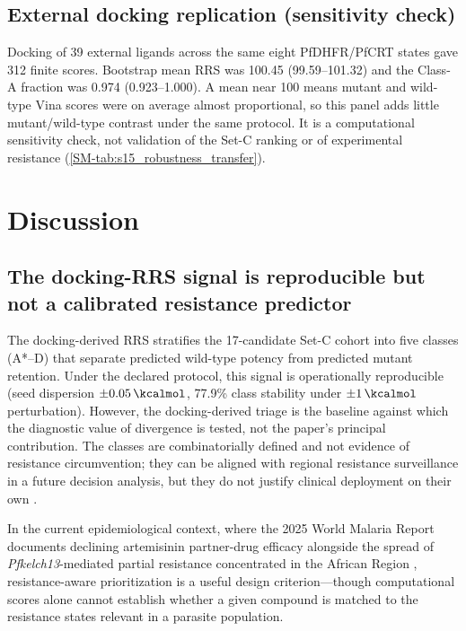 \documentclass[journal=jcisd8,manuscript=article,layout=traditional]{achemso}
\begin{document}
\subsection{External docking replication (sensitivity check)}

Docking of \num{39} external ligands across the same eight PfDHFR/PfCRT states gave \num{312} finite scores. Bootstrap mean RRS was \num{100.45} (\numrange{99.59}{101.32}) and the Class-A fraction was \num{0.974} (\numrange{0.923}{1.000}). A mean near \num{100} means mutant and wild-type Vina scores were on average almost proportional, so this panel adds little mutant/wild-type contrast under the same protocol. It is a computational sensitivity check, not validation of the Set-C ranking or of experimental resistance (\cref{SM-tab:s15_robustness_transfer}).


\section{Discussion}

\subsection{The docking-RRS signal is reproducible but not a calibrated resistance predictor}

The docking-derived RRS stratifies the 17-candidate Set-C cohort into five classes (A*--D) that separate predicted wild-type potency from predicted mutant retention. Under the declared protocol, this signal is operationally reproducible (seed dispersion $\pm\qty{0.05}{\kcalmol}$, 77.9\% class stability under $\pm\qty{1}{\kcalmol}$ perturbation). However, the docking-derived triage is the baseline against which the diagnostic value of divergence is tested, not the paper's principal contribution. The classes are combinatorially defined and not evidence of resistance circumvention; they can be aligned with regional resistance surveillance in a future decision analysis, but they do not justify clinical deployment on their own \citep{wwarn_2026}.

In the current epidemiological context, where the 2025 World Malaria Report documents declining artemisinin partner-drug efficacy alongside the spread of \textit{Pfkelch13}-mediated partial resistance concentrated in the African Region \citep{who_malaria_2025}, resistance-aware prioritization is a useful design criterion---though computational scores alone cannot establish whether a given compound is matched to the resistance states relevant in a parasite population.
\end{document}
